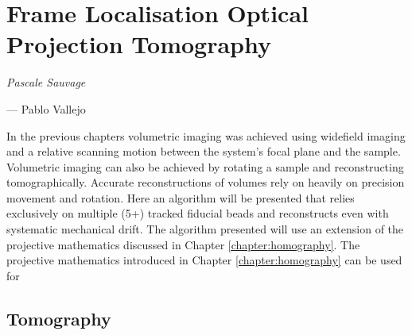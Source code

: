 \ifpdf
    \graphicspath{{Chapters/flopt/Figs/Raster/}{Chapters/flopt/Figs/PDF/}{Chapters/flopt/Figs/}}
\else
    \graphicspath{{Chapters/flopt/Figs/Vector/}{Chapters/flopt/Figs/}}
\fi

\chapter{Frame Localisation Optical Projection Tomography}\label{chapter:flopt}

\epigraph{\emph{Pascale Sauvage}}{--- Pablo Vallejo}

In the previous chapters volumetric imaging was achieved using widefield imaging and a relative scanning motion between the system's focal plane and the sample.
Volumetric imaging can also be achieved by rotating a sample and reconstructing tomographically.
Accurate reconstructions of volumes rely on heavily on precision movement and rotation.
Here an algorithm will be presented that relies exclusively on multiple (5+) tracked fiducial beads and reconstructs even with systematic mechanical drift.
The algorithm presented will use an extension of the projective mathematics discussed in Chapter \ref{chapter:homography}.%
The projective mathematics introduced in Chapter \ref{chapter:homography} can be used for %

\pagebreak

\section{Tomography}

